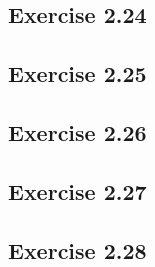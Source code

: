 \documentclass[../A&M.tex]{subfiles}
\begin{document}
\subsection*{Exercise 2.24}

\subsection*{Exercise 2.25}

\subsection*{Exercise 2.26}

\subsection*{Exercise 2.27}

\subsection*{Exercise 2.28}
\end{document}
